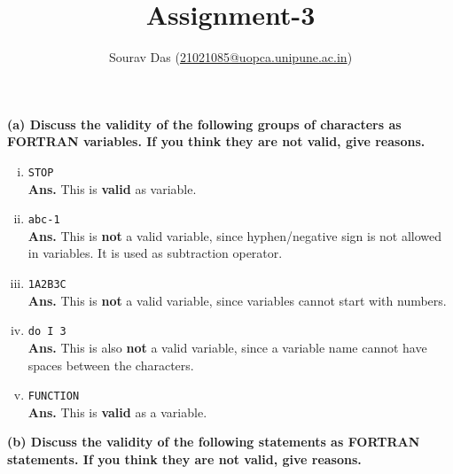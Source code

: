 \documentclass[11pt]{article} %
\title{Assignment-3}
\author{Sourav Das (\url{21021085@uopca.unipune.ac.in})}
\date{} %
\begin{document}
\maketitle

\textbf{(a) Discuss the validity of the following groups of characters as FORTRAN variables. If you think they are not valid, give reasons.}
\begin{enumerate}[(i)]
    \item \lstinline{STOP}\\
    \textbf{Ans.} This is \textbf{valid} as variable.
    \item \lstinline{abc-1}\\
    \textbf{Ans.} This is \textbf{not} a valid variable, since hyphen/negative sign is not allowed in variables. It is used as subtraction operator.
    \item \lstinline{1A2B3C}\\
    \textbf{Ans.} This is \textbf{not} a valid variable, since variables cannot start with numbers.
    \item \lstinline{do I 3}\\
    \textbf{Ans.} This is also \textbf{not} a valid variable, since a variable name cannot have spaces between the characters.
    \item \lstinline{FUNCTION}\\
    \textbf{Ans.} This is \textbf{valid} as a variable.
\end{enumerate}
\textbf{(b) Discuss the validity of the following statements as FORTRAN statements. If you think they are not valid, give reasons.}
\end{document}
